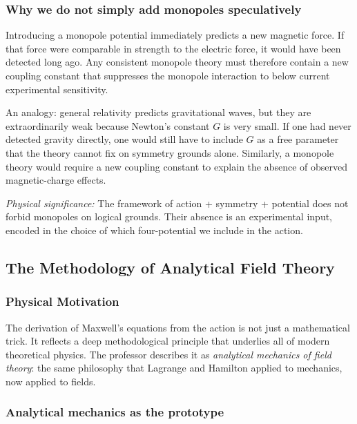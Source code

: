 \subsubsection*{Why we do not simply add monopoles speculatively}

Introducing a monopole potential immediately predicts a new magnetic force.  If that force were
comparable in strength to the electric force, it would have been detected long ago.  Any consistent
monopole theory must therefore contain a new coupling constant that suppresses the monopole
interaction to below current experimental sensitivity.

An analogy: general relativity predicts gravitational waves, but they are extraordinarily weak
because Newton's constant $G$ is very small.  If one had never detected gravity directly, one would
still have to include $G$ as a free parameter that the theory cannot fix on symmetry grounds alone.
Similarly, a monopole theory would require a new coupling constant to explain the absence of observed
magnetic-charge effects.

\textit{Physical significance:} The framework of action + symmetry + potential does not forbid
monopoles on logical grounds.  Their absence is an experimental input, encoded in the choice of which
four-potential we include in the action.

\subsection{The Methodology of Analytical Field Theory}\label{subsec:lec10-methodology}

\subsubsection*{Physical Motivation}
The derivation of Maxwell's equations from the action is not just a mathematical trick.  It reflects
a deep methodological principle that underlies all of modern theoretical physics.  The professor
describes it as \emph{analytical mechanics of field theory}: the same philosophy that Lagrange and
Hamilton applied to mechanics, now applied to fields.

\subsubsection*{Analytical mechanics as the prototype}

